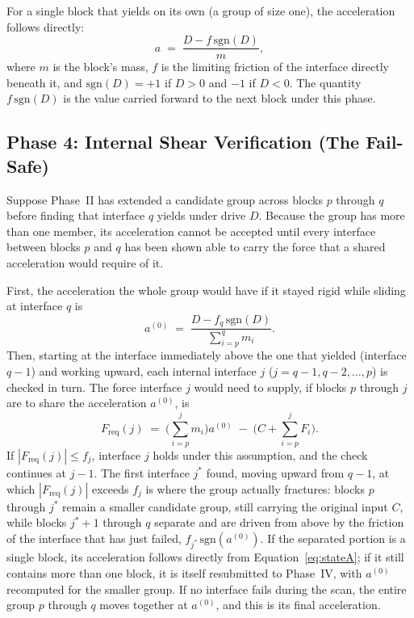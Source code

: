 \documentclass[11pt,a4paper]{article}
\begin{document}
For a single block that yields on its own (a group of size one), the acceleration follows directly:
\begin{equation}
a \;=\; \frac{D - f\,\mathrm{sgn}(D)}{m},
\label{eq:stateA}
\end{equation}
where $m$ is the block's mass, $f$ is the limiting friction of the interface directly beneath it, and $\mathrm{sgn}(D) = +1$ if $D>0$ and $-1$ if $D<0$. The quantity $f\,\mathrm{sgn}(D)$ is the value carried forward to the next block under this phase.

\subsection{Phase 4: Internal Shear Verification (The Fail-Safe)}

Suppose Phase~II has extended a candidate group across blocks $p$ through $q$ before finding that interface $q$ yields under drive $D$. Because the group has more than one member, its acceleration cannot be accepted until every interface between blocks $p$ and $q$ has been shown able to carry the force that a shared acceleration would require of it.

First, the acceleration the whole group would have if it stayed rigid while sliding at interface $q$ is
\begin{equation}
a^{(0)} \;=\; \frac{D - f_q\,\mathrm{sgn}(D)}{\displaystyle\sum_{i=p}^{q} m_i}.
\label{eq:a0}
\end{equation}
Then, starting at the interface immediately above the one that yielded (interface $q-1$) and working upward, each internal interface $j$ ($j = q-1, q-2, \dots, p$) is checked in turn. The force interface $j$ would need to supply, if blocks $p$ through $j$ are to share the acceleration $a^{(0)}$, is
\begin{equation}
F_{\mathrm{req}}(j) \;=\; \Big(\sum_{i=p}^{j} m_i\Big) a^{(0)} \;-\; \Big(C + \sum_{i=p}^{j} F_i\Big).
\label{eq:freq}
\end{equation}
If $|F_{\mathrm{req}}(j)| \le f_j$, interface $j$ holds under this assumption, and the check continues at $j-1$. The first interface $j^{*}$ found, moving upward from $q-1$, at which $|F_{\mathrm{req}}(j)|$ exceeds $f_j$ is where the group actually fractures: blocks $p$ through $j^{*}$ remain a smaller candidate group, still carrying the original input $C$, while blocks $j^{*}+1$ through $q$ separate and are driven from above by the friction of the interface that has just failed, $f_{j^{*}}\,\mathrm{sgn}(a^{(0)})$. If the separated portion is a single block, its acceleration follows directly from Equation~\eqref{eq:stateA}; if it still contains more than one block, it is itself resubmitted to Phase~IV, with $a^{(0)}$ recomputed for the smaller group. If no interface fails during the scan, the entire group $p$ through $q$ moves together at $a^{(0)}$, and this is its final acceleration.
\end{document}
